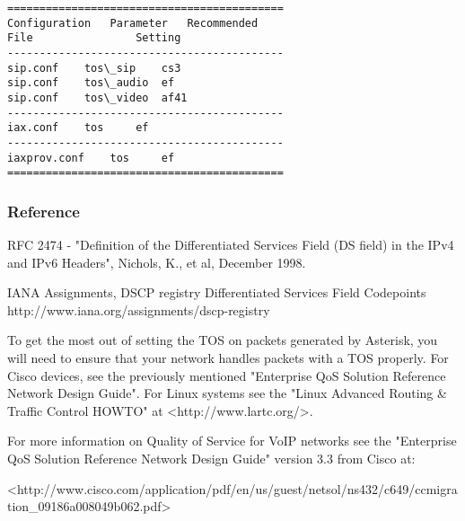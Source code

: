 \begin{verbatim}
===========================================
Configuration	Parameter	Recommended
File				Setting
-------------------------------------------
sip.conf	tos\_sip	cs3
sip.conf	tos\_audio	ef
sip.conf	tos\_video	af41
-------------------------------------------
iax.conf	tos		ef
-------------------------------------------
iaxprov.conf	tos		ef
===========================================
\end{verbatim}

\subsubsection{Reference}

RFC 2474 - "Definition of the Differentiated Services Field
(DS field) in the IPv4 and IPv6 Headers", Nichols, K., et al,
December 1998.

IANA Assignments, DSCP registry
Differentiated Services Field Codepoints
http://www.iana.org/assignments/dscp-registry

To get the most out of setting the TOS on packets generated by
Asterisk, you will need to ensure that your network handles packets
with a TOS properly.  For Cisco devices, see the previously mentioned
"Enterprise QoS Solution Reference Network Design Guide".  For Linux
systems see the "Linux Advanced Routing \& Traffic Control HOWTO" at
<http://www.lartc.org/>.

For more information on Quality of
Service for VoIP networks see the "Enterprise QoS Solution Reference
Network Design Guide" version 3.3 from Cisco at:

<http://www.cisco.com/application/pdf/en/us/guest/netsol/ns432/c649/ccmigration\_09186a008049b062.pdf>

